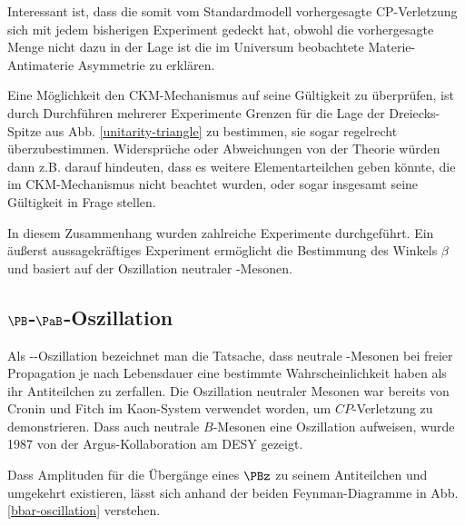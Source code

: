 Interessant ist, dass die somit vom Standardmodell vorhergesagte CP-Verletzung sich mit jedem bisherigen Experiment gedeckt hat, obwohl die vorhergesagte Menge nicht dazu in der Lage ist die im Universum beobachtete Materie-Antimaterie Asymmetrie zu erklären.

Eine Möglichkeit den CKM-Mechanismus auf seine Gültigkeit zu überprüfen, ist durch Durchführen mehrerer Experimente Grenzen für die Lage der Dreiecks-Spitze aus Abb. \ref{unitarity-triangle} zu bestimmen, sie sogar regelrecht überzubestimmen.
Widersprüche oder Abweichungen von der Theorie würden dann z.B. darauf hindeuten, dass es weitere Elementarteilchen geben könnte, die im CKM-Mechanismus nicht beachtet wurden, oder sogar insgesamt seine Gültigkeit in Frage stellen.

In diesem Zusammenhang wurden zahlreiche Experimente durchgeführt.
Ein äußerst aussagekräftiges Experiment ermöglicht die Bestimmung des Winkels $β$ und basiert auf der Oszillation neutraler \PB-Mesonen.

\subsection{$\PB$-$\PaB$-Oszillation}

Als \PB-\PaB-Oszillation bezeichnet man die Tatsache, dass neutrale \PB-Mesonen bei freier Propagation je nach Lebensdauer eine bestimmte Wahrscheinlichkeit haben als ihr Antiteilchen zu zerfallen.
Die Oszillation neutraler Mesonen war bereits von Cronin und Fitch im Kaon-System verwendet worden, um $CP$-Verletzung zu demonstrieren\cite{kaons-cronin-fitch}.
Dass auch neutrale $B$-Mesonen eine Oszillation aufweisen, wurde 1987 von der Argus-Kollaboration am DESY gezeigt\cite{argus-bbar}.

Dass Amplituden für die Übergänge eines $\PBz$ zu seinem Antiteilchen und umgekehrt existieren, lässt sich anhand der beiden Feynman-Diagramme in Abb. \ref{bbar-oscillation} verstehen.

